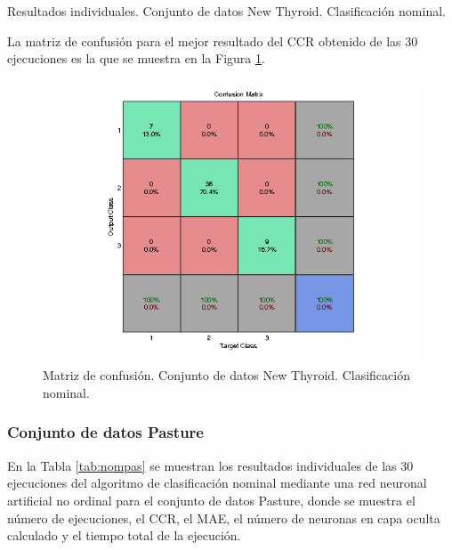 			\begin{table}[!htbp]
				\centering
				\caption{Resultados individuales. Conjunto de datos New Thyroid. Clasificación nominal.}
				\label{tab:nomnew}
			\end{table}
			
			La matriz de confusión para el mejor resultado del CCR obtenido de las 30 ejecuciones es la que se muestra en la Figura \ref{fig:nomnew}.
			
			\begin{figure}[htbp]
				\centering
				\includegraphics[scale=0.8]{../src/results/nominal/newthyroid_mc14.png}
				\caption{Matriz de confusión. Conjunto de datos New Thyroid. Clasificación nominal.}
				\label{fig:nomnew}
			\end{figure}

			\subsubsection{Conjunto de datos Pasture}
			
			En la Tabla \ref{tab:nompas} se muestran los resultados individuales de las 30 ejecuciones del algoritmo de clasificación nominal mediante una red neuronal artificial no ordinal para el conjunto de datos Pasture, donde se muestra el número de ejecuciones, el CCR, el MAE, el número de neuronas en capa oculta calculado y el tiempo total de la ejecución.\\
			
